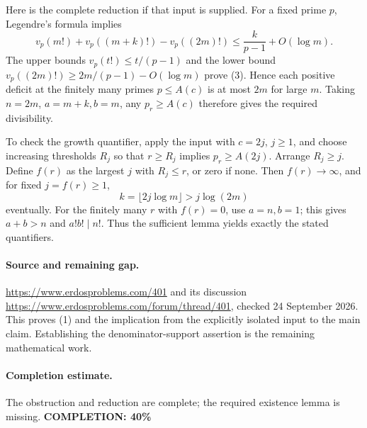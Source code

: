 Here is the complete reduction if that input is supplied.
For a fixed prime \(p\), Legendre's formula implies
\[
 v_p(m!)+v_p((m+k)!)-v_p((2m)!)
 \leq \frac{k}{p-1}+O(\log m).
 \tag{3}
\]
The upper bounds \(v_p(t!)\leq t/(p-1)\) and the
lower bound \(v_p((2m)!)\geq2m/(p-1)-O(\log m)\) prove (3).
Hence each positive deficit at the finitely many primes \(p\leq A(c)\)
is at most \(2m\) for large \(m\). Taking \(n=2m\),
\(a=m+k,b=m\), any \(p_r\geq A(c)\) therefore gives the required
divisibility.

To check the growth quantifier, apply the input with \(c=2j\), \(j\geq1\),
and choose increasing thresholds \(R_j\) so that \(r\geq R_j\) implies
\(p_r\geq A(2j)\). Arrange \(R_j\geq j\).
Define \(f(r)\) as the largest \(j\) with \(R_j\leq r\), or zero if none.
Then \(f(r)\to\infty\), and for fixed \(j=f(r)\geq1\),
\[
 k=\lfloor2j\log m\rfloor>j\log(2m)
\]
eventually. For the finitely many \(r\) with \(f(r)=0\), use
\(a=n,b=1\); this gives \(a+b>n\) and \(a!b!\mid n!\).
Thus the sufficient lemma yields exactly the stated quantifiers.

\paragraph{Source and remaining gap.}
\url{https://www.erdosproblems.com/401} and its discussion
\url{https://www.erdosproblems.com/forum/thread/401},
checked 24 September 2026. This proves (1) and the implication from
the explicitly isolated input to the main claim. Establishing the
denominator-support assertion is the remaining mathematical work.

\paragraph{Completion estimate.}
The obstruction and reduction are complete; the required existence lemma is missing.
\textbf{COMPLETION: 40\%}
